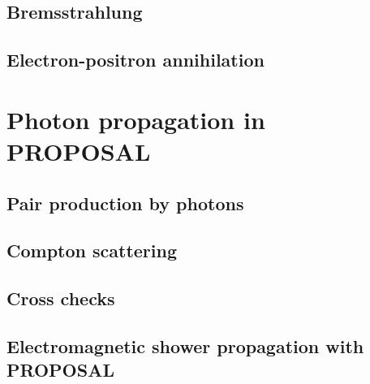 \subsection{Bremsstrahlung}

\subsection{Electron-positron annihilation}

\section{Photon propagation in PROPOSAL}

\subsection{Pair production by photons}

\subsection{Compton scattering}

\subsection{Cross checks}

\subsection{Electromagnetic shower propagation with PROPOSAL}